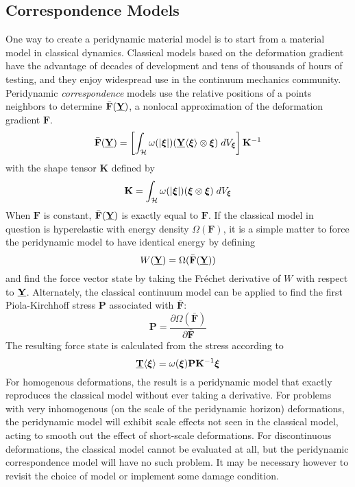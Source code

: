 \subsection{Correspondence Models}
One way to create a peridynamic material model is to start from a material model in classical dynamics.
Classical models based on the deformation gradient have the advantage of decades of development and tens of thousands of hours of testing, and they enjoy widespread use in the continuum mechanics community.
Peridynamic \textit{correspondence} models use the relative positions of a points neighbors to determine $\bar{\mathbf{F}}(\vstate{Y}{}{})$, a nonlocal approximation of the deformation gradient $\mathbf{F}$.
%
\begin{equation}
\label{eq:PDapproxGradient}
\bar{\mathbf{F}}(\vstate{Y}{}{}) = \left[\int_\mathcal{H} \omega(|\boldsymbol{\xi}|)(\vstate{Y}{}{\boldsymbol{\xi}}\otimes \boldsymbol{\xi})\;dV_{\boldsymbol{\xi}} \right]\mathbf{K}^{-1}
\end{equation}
with the shape tensor $\mathbf{K}$ defined by
\begin{equation}
\mathbf{K} = \int_\mathcal{H}\omega(|\boldsymbol{\xi}|)(\boldsymbol{\xi} \otimes \boldsymbol{\xi})\;dV_{\boldsymbol{\xi}} \notag
\end{equation}
%
When $\mathbf{F}$ is constant, $\bar{\mathbf{F}}(\vstate{Y}{}{})$ is exactly equal to $\mathbf{F}$.
If the classical model in question is hyperelastic with energy density $\Omega(\mathbf{F})$, it is a simple matter to force the peridynamic model to have identical energy by defining
\begin{equation}
W(\vstate{Y}{}{}) = \Omega(\bar{\mathbf{F}}(\vstate{Y}{}{}))
\end{equation}
and find the force vector state by taking the Fr\'echet derivative of $W$ with respect to $\vstate{Y}{}{}$.
Alternately, the classical continuum model can be applied to find the first Piola-Kirchhoff stress $\mathbf{P}$ associated with $\bar{\mathbf{F}}$:
\begin{equation}
\mathbf{P}=\frac{\partial\Omega(\bar{\mathbf{F}})}{\partial\bar{\mathbf{F}}}
\end{equation}
The resulting force state is calculated from the stress according to
\begin{equation}
\vstate{T}{}{\boldsymbol{\xi}} = \omega(\boldsymbol{\xi})\mathbf{P}\mathbf{K}^{-1}\boldsymbol{\xi}
\end{equation}
For homogenous deformations, the result is a peridynamic model that exactly reproduces the classical model without ever taking a derivative.
For problems with very inhomogenous (on the scale of the peridynamic horizon) deformations, the peridynamic model will exhibit scale effects not seen in the classical model, acting to smooth out the effect of short-scale deformations.
For discontinuous deformations, the classical model cannot be evaluated at all, but the peridynamic correspondence model will have no such problem.
It may be necessary however to revisit the choice of model or implement some damage condition. 
